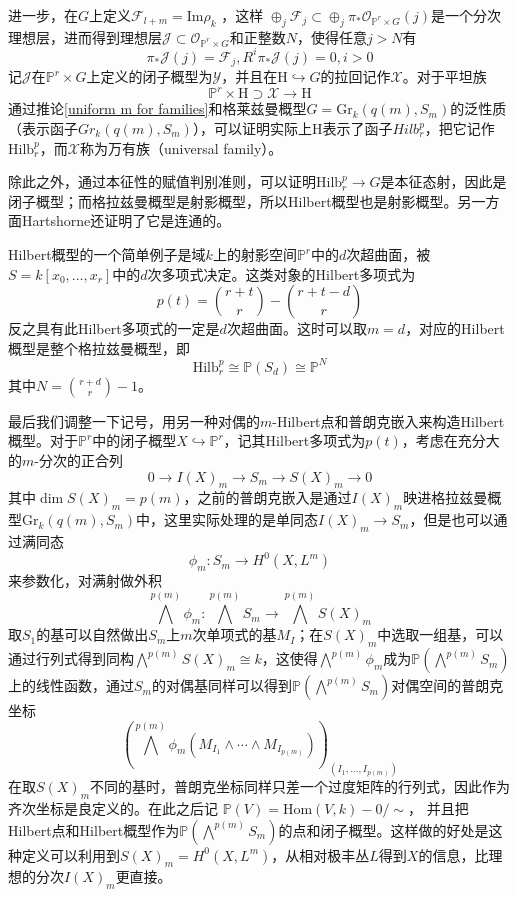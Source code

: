 进一步，在$ G $上定义$ \mathscr{F}_{l+m}=\mathrm{Im} \rho_k$ ，这样 $\oplus_{j}\mathscr{F}_j\subset \oplus_j\pi _*\mathscr{O}_{\mathbb{P}^r\times G}(j) $是一个分次理想层，进而得到理想层$ \mathscr{J}\subset \mathscr{O}_{\mathbb{P}^r\times G} $和正整数$ N $，使得任意$ j>N $有
$$ \pi_*\mathscr{J}(j)=\mathscr{F}_j,R^i\pi_*\mathscr{J}(j)=0,i>0 $$
记$ \mathscr{J} $在$ \mathbb{P}^r\times G$上定义的闭子概型为$ \mathcal{Y} $，并且在$ \mathrm{H}\hookrightarrow G $的拉回记作$ \mathcal{X} $。对于平坦族
$$ \mathbb{P}^r\times \mathrm{H}\supset \mathcal{X}\to \mathrm{H} $$
通过推论\ref{uniform m for families}和格莱兹曼概型$ G=\mathrm{Gr}_k(q(m),S_m) $的泛性质（表示函子$ Gr_k(q(m),S_m) $），可以证明实际上$ \mathrm{H} $表示了函子$ Hilb_r^p $，把它记作$ \mathrm{Hilb}_r^p $，而$ \mathcal{X} $称为万有族（universal family）。

除此之外，通过本征性的赋值判别准则，可以证明$ \mathrm{Hilb}_r^p\to G $是本征态射，因此是闭子概型；而格拉兹曼概型是射影概型，所以Hilbert概型也是射影概型。另一方面Hartshorne还证明了它是连通的。

Hilbert概型的一个简单例子是域$ k $上的射影空间$ \mathbb{P}^r $中的$ d $次超曲面，被$ S=k[x_0,\ldots,x_r] $中的$ d $次多项式决定。这类对象的Hilbert多项式为
$$ p(t)=\binom{r+t}{r}-\binom{r+t-d}{r} $$
反之具有此Hilbert多项式的一定是$ d $次超曲面。这时可以取$ m=d $，对应的Hilbert概型是整个格拉兹曼概型，即
$$ \mathrm{Hilb}_r^p\cong \mathbb{P}(S_d)\cong\mathbb{P}^N $$
其中$ N=\binom{r+d}{r}-1 $。


最后我们调整一下记号，用另一种对偶的$ m $-Hilbert点和普朗克嵌入来构造Hilbert概型。对于$ \mathbb{P}^r $中的闭子概型$ X\hookrightarrow \mathbb{P}^r $，记其Hilbert多项式为$ p(t) $，考虑在充分大的$ m $-分次的正合列
$$ 0 \to I(X)_m \to S_m \to S(X)_m \to 0 $$
其中$ \dim S(X)_m=p(m)  $，之前的普朗克嵌入是通过$  I(X)_m $映进格拉兹曼概型$ \mathrm{Gr}_k(q(m),S_m) $中，这里实际处理的是单同态$ I(X)_m \to S_m $，但是也可以通过满同态$$  \phi _m:S_m \to H^0(X,L^m) $$
来参数化，对满射做外积
$$ \bigwedge ^{p(m)}\phi_m: \bigwedge ^{p(m)}S_m\to \bigwedge ^{p(m)} S(X)_m $$
取$ S_1 $的基可以自然做出$ S_m $上$ m $次单项式的基$ M_I $；在$ S(X)_m $中选取一组基，可以通过行列式得到同构$\bigwedge ^{p(m)} S(X)_m\cong k $，这使得$ \bigwedge ^{p(m)}\phi_m $成为$ \mathbb{P}(\bigwedge ^{p(m)}S_m) $上的线性函数，通过$ S_m $的对偶基同样可以得到$ \mathbb{P}(\bigwedge ^{p(m)}S_m) $对偶空间的普朗克坐标
$$ (\bigwedge ^{p(m)}\phi_m(M_{I_1}\wedge\cdots \wedge M_{I_{p(m)}}))_{(I_1,\ldots,I_{p(m)})} $$
在取$ S(X)_m $不同的基时，普朗克坐标同样只差一个过度矩阵的行列式，因此作为齐次坐标是良定义的。在此之后记
$ \mathbb{P}(V)=\mathrm{Hom}(V,k)-0/\sim $，
并且把Hilbert点和Hilbert概型作为$ \mathbb{P}(\bigwedge^{p(m)}S_m)$的点和闭子概型。这样做的好处是这种定义可以利用到$ S(X)_m=H^0(X,L^m) $，从相对极丰丛$ L $得到$ X $的信息，比理想的分次$ I(X)_m $更直接。
